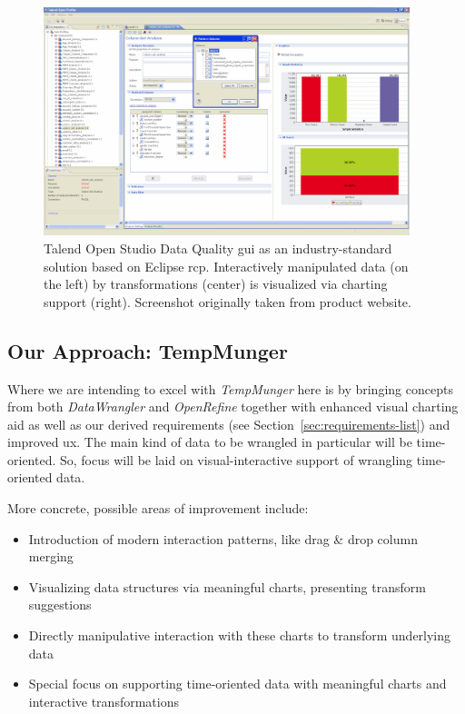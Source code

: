 \begin{figure}
  \centering
  \includegraphics[width=0.95\textwidth]{figures/state-of-the-art/talend-open-studio}
  \caption{Talend Open Studio Data Quality \gls{gui} as an industry-standard solution based on Eclipse \gls{rcp}. Interactively manipulated data (on the left) by transformations (center) is visualized via charting support (right). Screenshot originally taken from product website.}
  \label{fig:talend-open-studio-screenshot}
\end{figure}


\subsection{Our Approach: TempMunger}

Where we are intending to excel with \emph{TempMunger} here is by bringing concepts from both \emph{DataWrangler} and \emph{OpenRefine} together with enhanced visual charting aid as well as our derived requirements (see Section~\ref{sec:requirements-list}) and improved \gls{ux}. The main kind of data to be wrangled in particular will be time-oriented. So, focus will be laid on visual-interactive support of wrangling time-oriented data.

More concrete, possible areas of improvement include:

\begin{itemize}
  \item Introduction of modern interaction patterns, like drag \& drop column merging
  \item Visualizing data structures via meaningful charts, presenting transform suggestions
  \item Directly manipulative interaction with these charts to transform underlying data
  \item Special focus on supporting time-oriented data with meaningful charts and interactive transformations
\end{itemize}

